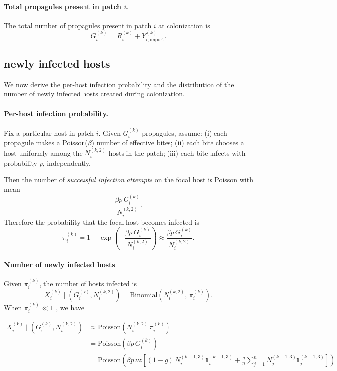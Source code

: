 \documentclass[12pt]{article}
\begin{document}
\paragraph{Total propagules present in patch $i$.}
The total number of propagules present in patch $i$ at colonization is
\begin{equation}
G_i^{(k)} = R_i^{(k)} + Y_{i,\mathrm{import}}^{(k)}.
\label{eq:Gi}
\end{equation}

\subsection{newly infected hosts}
We now derive the per-host infection probability and the distribution of the number of newly infected hosts created during colonization.

\paragraph{Per-host infection probability.}
Fix a particular host in patch $i$. Given $G_i^{(k)}$ propagules, assume:
(i) each propagule makes a Poisson($\beta$) number of effective bites;
(ii) each bite chooses a host uniformly among the $N_i^{(k,2)}$ hosts in the patch;
(iii) each bite infects with probability $p$, independently.

Then the number of \emph{successful infection attempts} on the focal host is Poisson with mean
\[
\frac{\beta p\,G_i^{(k)}}{N_i^{(k,2)}}.
\]
Therefore the probability that the focal host becomes infected is
\begin{equation}
\pi_i^{(k)} = 1-\exp\!\left(-\frac{\beta p\,G_i^{(k)}}{N_i^{(k,2)}}\right)\approx\frac{\beta p\,G_i^{(k)}}{N_i^{(k,2)}}
.
\label{eq:pi}
\end{equation}

\paragraph{Number of newly infected hosts}
Given $\pi_i^{(k)}$, the number of hosts infected is
\[
X_i^{(k)} \mid \left(G_i^{(k)},N_i^{(k,2)}\right) = \mathrm{Binomial}\!\left(N_i^{(k,2)},\,\pi_i^{(k)}\right).
\]
When $\pi_i^{(k)}\ll 1$ , we have

\begin{equation}
\begin{aligned}
X_i^{(k)} \mid \left(G_i^{(k)}, N_i^{(k,2)}\right)
&\approx
\mathrm{Poisson}\!\left(N_i^{(k,2)}\,\pi_i^{(k)}\right) \\
&=
\mathrm{Poisson}\!\left(\beta p\,G_i^{(k)}\right) \\
&=
\mathrm{Poisson}\!\left(
\beta p\,\nu z \left[
(1-g)\,N_i^{(k-1,3)}\mathds{1}_i^{(k-1,3)}
+
\frac{g}{n}\sum_{j=1}^n
N_j^{(k-1,3)}\mathds{1}_j^{(k-1,3)}
\right]
\right)
\end{aligned}
\label{eq:X_poisson_approx}
\end{equation}
\end{document}
